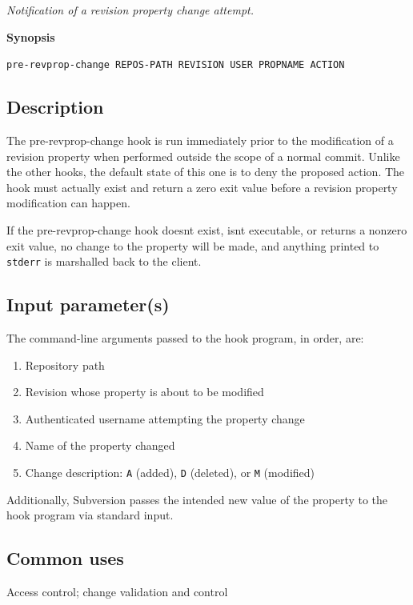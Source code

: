 \emph{Notification of a revision property change attempt.}

\textbf{Synopsis}

\texttt{pre-revprop-change\ REPOS-PATH\ REVISION\ USER\ PROPNAME\ ACTION}

\subsection{Description}

The pre-revprop-change hook is run immediately prior to the modification
of a revision property when performed outside the scope of a normal
commit. Unlike the other hooks, the default state of this one is to deny
the proposed action. The hook must actually exist and return a zero exit
value before a revision property modification can happen.

If the pre-revprop-change hook doesn\textquotesingle t exist,
isn\textquotesingle t executable, or returns a nonzero exit value, no
change to the property will be made, and anything printed to
\texttt{stderr} is marshalled back to the client.

\subsection{Input parameter(s)}

The command-line arguments passed to the hook program, in order, are:

\begin{enumerate}
\def\labelenumi{\arabic{enumi}.}
\item
  Repository path
\item
  Revision whose property is about to be modified
\item
  Authenticated username attempting the property change
\item
  Name of the property changed
\item
  Change description: \texttt{A} (added), \texttt{D} (deleted), or
  \texttt{M} (modified)
\end{enumerate}

Additionally, Subversion passes the intended new value of the property
to the hook program via standard input.

\subsection{Common uses}

Access control; change validation and control

